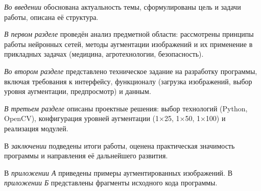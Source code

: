 \emph{Во введении} обоснована актуальность темы, сформулированы цель и задачи работы, описана её структура.

\emph{В первом разделе} проведён анализ предметной области: рассмотрены принципы работы нейронных сетей, методы аугментации изображений и их применение в прикладных задачах (медицина, агротехнологии, безопасность).

\emph{Во втором разделе} представлено техническое задание на разработку программы, включая требования к интерфейсу, функционалу (загрузка изображений, выбор уровня аугментации, предпросмотр) и данным.

\emph{В третьем разделе} описаны проектные решения: выбор технологий (Python, OpenCV), конфигурация уровней аугментации (1×25, 1×50, 1×100) и реализация модулей.

В \emph{заключении} подведены итоги работы, оценена практическая значимость программы и направления её дальнейшего развития.

В \emph{приложении А} приведены примеры аугментированных изображений.
В \emph{приложении Б} представлены фрагменты исходного кода программы. 
